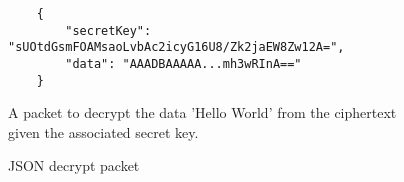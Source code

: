 \begin{figure}[H]
  \centering
  \begin{verbatim}
	{
		"secretKey": "sUOtdGsmFOAMsaoLvbAc2icyG16U8/Zk2jaEW8Zw12A=",
		"data": "AAADBAAAAA...mh3wRInA=="
	}
  \end{verbatim}
  \caption{
  	JSON decrypt packet
  }{
  	A packet to decrypt the data 'Hello World' from the ciphertext given the associated secret key.
  }
  \label{code:decrypt_data_json}
\end{figure}
